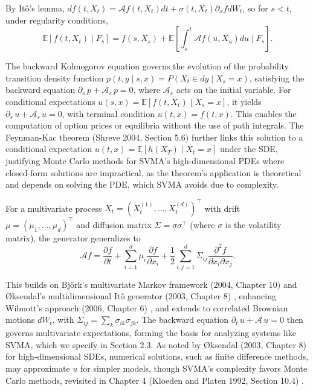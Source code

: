 \documentclass[12pt]{report}
\begin{document}
By Itô’s lemma, \(df(t, X_t) = \mathcal{A}f(t, X_t)dt + \sigma(t, X_t) {\partial_x}{f} dW_t\), so for \(s < t\), under regularity conditions,
\[
    \mathbb{E}[f(t, X_t) \mid F_s] = f(s, X_s) + \mathbb{E}\left[\int_s^t \mathcal{A}f(u, X_u)du \mid F_s\right].
\]

The backward Kolmogorov equation governs the evolution of the probability transition density function \(p(t, y \mid s, x) = P(X_t \in dy \mid X_s = x)\), satisfying the backward equation \(\partial_s\,p + \mathcal{A}_s\,p = 0\), where \(\mathcal{A}_s\) acts on the initial variable. For conditional expectations \(u(s, x) = \mathbb{E}[f(t, X_t) \mid X_s = x]\), it yields \(\partial_s\,u + \mathcal{A}_s\,u = 0\), with terminal condition \(u(t, x) = f(t, x)\). This enables the computation of option prices or equilibria without the use of path integrals. The Feynman-Kac theorem (Shreve 2004, Section 5.6) \cite{shreve2004} further links this solution to a conditional expectation \(u(t, x) = \mathbb{E}[h(X_T) \mid X_t = x]\) under the SDE, justifying Monte Carlo methods for SVMA’s high-dimensional PDEs where closed-form solutions are impractical, as the theorem’s application is theoretical and depends on solving the PDE, which SVMA avoids due to complexity.

\vspace{0.2in}

For a multivariate process \(X_t = (X_t^{(1)}, \ldots, X_t^{(d)})^\top\) with drift \(\mu = (\mu_1, \ldots, \mu_d)^\top\) and diffusion matrix \(\Sigma = \sigma \sigma^\top\) (where \(\sigma\) is the volatility matrix), the generator generalizes to
\[
    \mathcal{A}f = \frac{\partial f}{\partial t} + \sum_{i=1}^d \mu_i \frac{\partial f}{\partial x_i} + \frac{1}{2} \sum_{i,j=1}^d \Sigma_{ij} \frac{\partial^2 f}{\partial x_i \partial x_j}.
\]

This builds on Björk’s multivariate Markov framework (2004, Chapter 10) \cite{bjork2004} and Øksendal’s multidimensional Itô generator (2003, Chapter 8) \cite{oksendal2003}, enhancing Wilmott’s approach (2006, Chapter 6) \cite{wilmott2006}, and extends to correlated Brownian motions \(dW_t\), with \(\Sigma_{ij} = \sum_k \sigma_{ik} \sigma_{jk}\). The backward equation \(\partial_t\,u + \mathcal{A}\,u = 0\) then governs multivariate expectations, forming the basis for analyzing systems like SVMA, which we specify in Section 2.3. As noted by Øksendal (2003, Chapter 8) \cite{oksendal2003} for high-dimensional SDEs, numerical solutions, such as finite difference methods, may approximate \(u\) for simpler models, though SVMA’s complexity favors Monte Carlo methods, revisited in Chapter 4 (Kloeden and Platen 1992, Section 10.4) \cite{kloeden1992numerical}.
\end{document}
